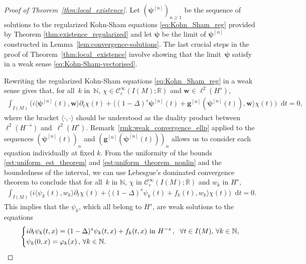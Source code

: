 \documentclass[12pt,a4paper]{amsart}
\numberwithin{equation}{section}
\newcommand{\ulg}{\boldsymbol{g}}
\newcommand{\ulpsi}{\boldsymbol{\psi}}
\newcommand{\ulw}{\boldsymbol{w}}
\newcommand*\diff{\mathop{}\!\mathrm{d}}
\begin{document}
	\begin{proof}[Proof of Theorem~\ref{thm:local_existence}]
		Let $(\ulpsi^{[n]})_{n \geq 1}$ be the sequence of solutions to the regularized Kohn-Sham equations \eqref{eq:Kohn_Sham_reg} provided by Theorem \ref{thm:existence_regularized} and let $\ulpsi$ be the limit of $\ulpsi^{[n]}$ constructed in Lemma~\ref{lem:convergence-solutions}. The last crucial steps in the proof of Theorem~\ref{thm:local_existence} involve showing that the limit~$ \ulpsi $ satisfy in a weak sense  \eqref{eq:Kohn-Sham-vectorised}.
		
		Rewriting the regularized Kohn-Sham equations \eqref{eq:Kohn_Sham_reg} in a weak sense gives that, for all~$k$ in~$\mathbb{N}$, $\chi \in \mathscr{C}_{c}^\infty (I(M);\mathbb{R})$ and $\ulw \in \ell^2(H^{s})$, 
		\begin{align}
			\int_{I(M)}  \Big(i\langle  \ulpsi^{[n]}(t) , \ulw \rangle \partial_{t} \chi(t) + \big\langle (1-\Delta)^s \ulpsi^{[n]}(t) +  \ulg^{[n]} (\ulpsi^{[n]}(t)) , \ulw \big\rangle \chi(t)  \Big)\diff  t = 0,
		\end{align} 
		where the bracket $ \langle \cdot,\cdot \rangle $ should be understood as the duality product between~$ \ell^2(H^{-s})$ and~$\ell^2(H^{s})$. 
		Remark~\ref{rmk:weak_convergence_ellp} applied to the sequences $(\ulpsi^{[n]}(t))_n$ and $(\ulg^{[n]}(\ulpsi^{[n]}(t)))_n$ allows us to consider each equation individually at fixed $k$. From the uniformity of the bounds \eqref{est:uniform_est_theorem} and \eqref{est:uniform_theorem_nonlin} and the boundedness of the interval, we can use Lebesgue's dominated convergence theorem to conclude that for all~$k$ in $\mathbb{N}$, $\chi$ in $\mathscr{C}_{c}^\infty (I(M);\mathbb{R})$ and $w_k$ in $H^{s}$, 
		\begin{align}
			\int_{I(M)} \Big( i\langle  \psi_{k}(t) , w_k \rangle \partial_{t} \chi(t) + \langle (1-\Delta)^s \psi_{k}(t) + f_{k}(t) , w_k \rangle  \chi(t)\Big)  \diff  t= 0 .
		\end{align} 
		This implies that the $ \psi_k$, which all belong to $H^s$, are weak solutions to the equations
		\begin{equation}
			\label{eq:Kohn_Sham_with_f}
			\begin{dcases}
				i \partial_t \psi_{k}(t,x) = (1-\Delta)^s \psi_{k}(t,x) + f_{k}(t,x) \text{ in } H^{-s} \, , \;\ \forall t \in I(M), \, \forall k \in \mathbb{N}, \\
				\psi_k(0,x)= \varphi_k (x) \, , \, \forall k \in \mathbb{N}.
			\end{dcases}

\end{equation}
\end{proof}
\end{document}
